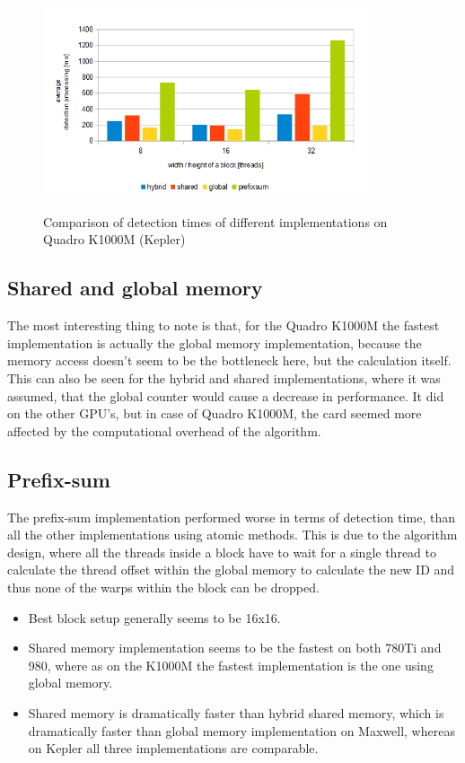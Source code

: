 \begin{center}
\begin{figure}[h]
	\centering\includegraphics[width=0.85\textwidth]{fig/1080_detection_quadrok1000m.png}\label{fig:quadro-det-measurement}
	\caption{Comparison of detection times of different implementations on Quadro K1000M (Kepler)}
\end{figure}
\end{center}

\subsection{Shared and global memory}

The most interesting thing to note is that, for the Quadro K1000M the fastest implementation is actually the global memory implementation, because the memory access doesn't seem to be the bottleneck here, but the calculation itself. This can also be seen for the hybrid and shared implementations, where it was assumed, that the global counter would cause a decrease in performance. It did on the other GPU's, but in case of Quadro K1000M, the card seemed more affected by the computational overhead of the algorithm.

\subsection{Prefix-sum}

The prefix-sum implementation performed worse in terms of detection time, than all the other implementations using atomic methods. This is due to the algorithm design, where all the threads inside a block have to wait for a single thread to calculate the thread offset within the global memory to calculate the new ID and thus none of the warps within the block can be dropped.

\begin{itemize}
	\item Best block setup generally seems to be 16x16.
	\item Shared memory implementation seems to be the fastest on both 780Ti and 980, where as on the K1000M the fastest implementation is the one using global memory.
	\item Shared memory is dramatically faster than hybrid shared memory, which is dramatically faster than global memory implementation on Maxwell, whereas on Kepler all three implementations are comparable.
\end{itemize}

